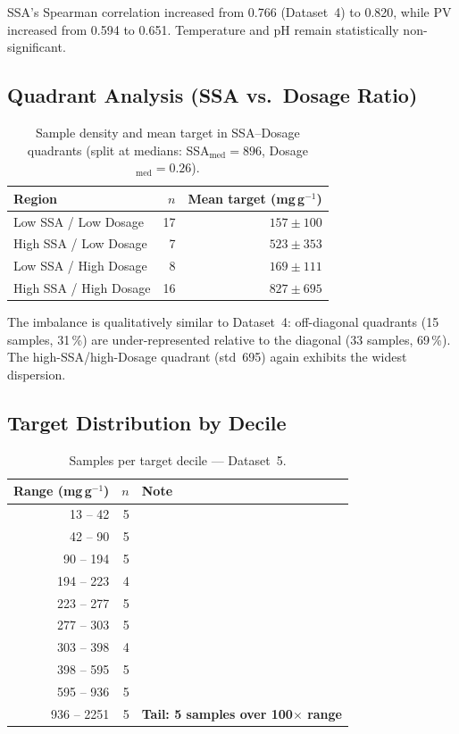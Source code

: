 \documentclass[12pt,a4paper]{article}
\begin{document}
SSA's Spearman correlation increased from 0.766 (Dataset~4) to 0.820,
while PV increased from 0.594 to 0.651.  Temperature and pH remain
statistically non-significant.

\subsection{Quadrant Analysis (SSA vs.\ Dosage Ratio)}

\begin{table}[h]
\centering
\caption{Sample density and mean target in SSA--Dosage quadrants
  (split at medians: SSA$_\text{med}=896$, Dosage$_\text{med}=0.26$).}
\label{tab:ds5_quadrant}
\begin{tabular}{lrr}
\toprule
Region & $n$ & Mean target (mg\,g$^{-1}$) \\
\midrule
Low SSA / Low Dosage   & 17 & $157 \pm 100$ \\
High SSA / Low Dosage  &  7 & $523 \pm 353$ \\
Low SSA / High Dosage  &  8 & $169 \pm 111$ \\
High SSA / High Dosage & 16 & $827 \pm 695$ \\
\bottomrule
\end{tabular}
\end{table}

The imbalance is qualitatively similar to Dataset~4: off-diagonal
quadrants (15 samples, 31\,\%) are under-represented relative to the
diagonal (33 samples, 69\,\%).  The high-SSA/high-Dosage quadrant
(std~695) again exhibits the widest dispersion.

\subsection{Target Distribution by Decile}

\begin{table}[h]
\centering
\caption{Samples per target decile — Dataset~5.}
\label{tab:ds5_decile}
\small
\begin{tabular}{rrl}
\toprule
Range (mg\,g$^{-1}$) & $n$ & Note \\
\midrule
  13 -- 42   & 5 & \\
  42 -- 90   & 5 & \\
  90 -- 194  & 5 & \\
 194 -- 223  & 4 & \\
 223 -- 277  & 5 & \\
 277 -- 303  & 5 & \\
 303 -- 398  & 4 & \\
 398 -- 595  & 5 & \\
 595 -- 936  & 5 & \\
 936 -- 2251 & 5 & \textbf{Tail: 5 samples over 100$\times$ range} \\
\bottomrule
\end{tabular}
\end{table}
\end{document}
